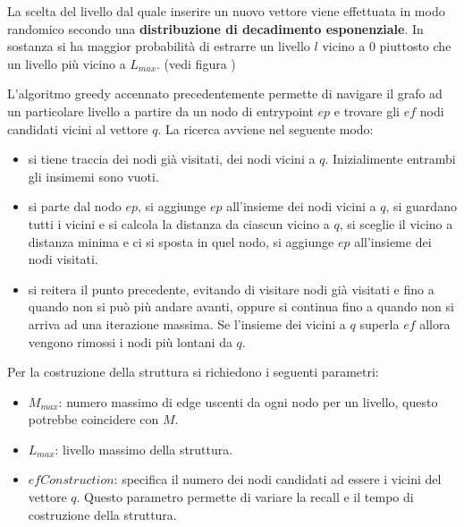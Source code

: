 \begin{nota}
    La scelta del livello dal quale inserire un nuovo vettore viene effettuata 
    in modo randomico secondo una \textbf{distribuzione di decadimento esponenziale}. 
    In sostanza si ha maggior probabilità di estrarre un livello $l$ vicino a $0$ 
    piuttosto che un livello più vicino a $L_{max}$. (vedi figura \cite{exp_decay})
\end{nota}

\begin{nota}
    L'algoritmo greedy accennato precedentemente permette di navigare il grafo 
    ad un particolare livello a partire da un nodo di entrypoint $ep$ e trovare gli $ef$ 
    nodi candidati vicini al vettore $q$. 
    La ricerca avviene nel seguente modo:
    \begin{itemize}
        \item si tiene traccia dei nodi già visitati, dei nodi vicini a $q$. Inizialimente 
        entrambi gli insimemi sono vuoti.
        \item si parte dal nodo $ep$, si aggiunge $ep$ all'insieme dei nodi vicini a $q$,
        si guardano tutti i vicini e si calcola la distanza da ciascun vicino a $q$,
        si sceglie il vicino a distanza minima e ci si sposta in quel nodo, si 
        aggiunge $ep$ all'insieme dei nodi visitati.
        \item si reitera il punto precedente, evitando di visitare nodi già visitati e
        fino a quando non si può più andare avanti, oppure si continua fino a quando 
        non si arriva ad una iterazione massima. Se l'insieme dei vicini a $q$
        superla $ef$ allora vengono rimossi i nodi più lontani da $q$.
    \end{itemize} 
\end{nota}

Per la costruzione della struttura si richiedono i seguenti parametri:
\begin{itemize}
    \item $M_{max}$: numero massimo di edge uscenti da ogni nodo per un livello, questo 
    potrebbe coincidere con $M$.
    \item $L_{max}$: livello massimo della struttura.
    \item $efConstruction$: specifica il numero dei nodi candidati ad essere i vicini 
    del vettore $q$. Questo parametro permette di variare la recall e il tempo di 
    costruzione della struttura.
\end{itemize} 



